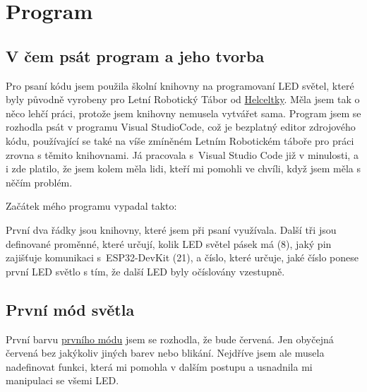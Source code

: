 \chapter{Program}

\section{V čem psát program a jeho tvorba}

Pro psaní kódu jsem použila školní knihovny na programovaní LED světel, které byly původně vyrobeny pro Letní Robotický Tábor od 
 \href{https://helceletka.cz/tabory/#id=5357}{Helceltky}. Měla jsem tak o něco lehčí práci, protože jsem knihovny nemusela vytvářet sama. Program jsem se rozhodla psát v programu Visual StudioCode,\cite{Visualstudio} což je bezplatný editor zdrojového kódu, používající se také na víše zmíněném Letním Robotickém táboře pro práci zrovna s těmito knihovnami. Já pracovala s~Visual Studio Code již v minulosti, a i zde platilo, že jsem kolem měla lidi, kteří mi pomohli ve chvíli, když jsem měla s něčím problém. 

Začátek mého programu vypadal takto:




%



První dva řádky jsou knihovny, které jsem při psaní využívala. Další tři jsou definované proměnné, které určují, kolik LED světel pásek má (8), jaký pin zajišťuje komunikaci s~ESP32-DevKit (21), a číslo, které určuje, jaké číslo ponese první LED světlo s tím, že další LED byly očíslovány vzestupně.

\newpage

\section{První mód světla}
První barvu 
 \href{https://github.com/Nemesis-Rain/Supplements-/blob/main/4-barevne-mody/blikani-jedna.cpp}{prvního módu} jsem se rozhodla, že bude červená. Jen obyčejná červená bez jakýkoliv jiných barev nebo blikání. Nejdříve jsem ale musela nadefinovat funkci, která mi pomohla v dalším postupu a usnadnila mi manipulaci se všemi LED. 

%



